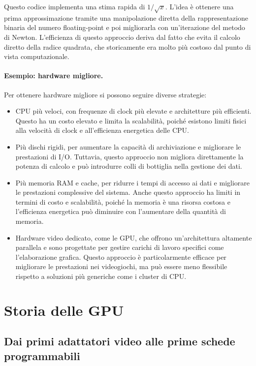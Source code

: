 Questo codice implementa una stima rapida di $1/\sqrt{x}$. 
L'idea è ottenere una prima approssimazione tramite una manipolazione diretta della rappresentazione binaria del numero floating-point e poi migliorarla con un'iterazione del metodo di Newton. L'efficienza di questo approccio deriva dal fatto che evita il calcolo diretto della radice quadrata, che storicamente era molto più costoso dal punto di vista computazionale. 

\paragraph{Esempio: hardware migliore.}
Per ottenere hardware migliore si possono seguire diverse strategie:
\begin{itemize}
    \item CPU più veloci, con frequenze di clock più elevate e architetture più efficienti. Questo ha un costo elevato e limita la scalabilità, poiché esistono limiti fisici alla velocità di clock e all'efficienza energetica delle CPU.
    \item Più dischi rigidi, per aumentare la capacità di archiviazione e migliorare le prestazioni di I/O. Tuttavia, questo approccio non migliora direttamente la potenza di calcolo e può introdurre colli di bottiglia nella gestione dei dati.
    \item Più memoria RAM e cache, per ridurre i tempi di accesso ai dati e migliorare le prestazioni complessive del sistema. Anche questo approccio ha limiti in termini di costo e scalabilità, poiché la memoria è una risorsa costosa e l'efficienza energetica può diminuire con l'aumentare della quantità di memoria.
    \item Hardware video dedicato, come le GPU, che offrono un'architettura altamente parallela e sono progettate per gestire carichi di lavoro specifici come l'elaborazione grafica. Questo approccio è particolarmente efficace per migliorare le prestazioni nei videogiochi, ma può essere meno flessibile rispetto a soluzioni più generiche come i cluster di CPU.
\end{itemize}

\section{Storia delle GPU}

\subsection{Dai primi adattatori video alle prime schede programmabili}

